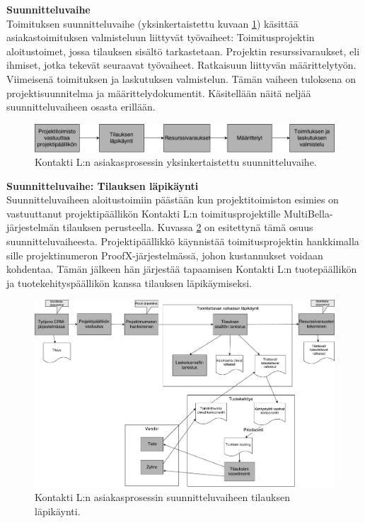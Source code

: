 \documentclass[finnish,12pt,a4paper,pdftex]{article}
\begin{document}
\textbf{Suunnitteluvaihe}\\


Toimituksen suunnitteluvaihe (yksinkertaistettu kuvaan \ref{fig:ykssuun}) käsittää asiakastoimituksen valmisteluun liittyvät työvaiheet: Toimitusprojektin aloitustoimet, jossa tilauksen sisältö tarkastetaan. Projektin resurssivaraukset, eli ihmiset, jotka tekevät seuraavat työvaiheet. Ratkaisuun liittyvän määrittelytyön. Viimeisenä toimituksen ja laskutuksen valmistelun. Tämän vaiheen tuloksena on projektisuunnitelma ja määrittelydokumentit. Käsitellään näitä neljää suunnitteluvaiheen osasta erillään.\\

\begin{figure}[!h]
    \centering
    \includegraphics[scale=0.35]{images/ykssuunn.pdf}
    \caption{Kontakti L:n asiakasprosessin yksinkertaistettu suunnitteluvaihe.}
    \label{fig:ykssuun}
\end{figure}


\textbf{Suunnitteluvaihe: Tilauksen läpikäynti}\\

Suunnitteluvaiheen aloitustoimiin päästään kun projektitoimiston esimies on vastuuttanut projektipäällikön Kontakti L:n toimitusprojektille MultiBella-järjestelmän tilauksen perusteella. Kuvassa \ref{fig:aloitustoimet} on esitettynä tämä osuus suunnitteluvaiheesta. Projektipäällikkö käynnistää toimitusprojektin hankkimalla sille projektinumeron ProofX-järjestelmässä, johon kustannukset voidaan kohdentaa. Tämän jälkeen hän järjestää tapaamisen Kontakti L:n tuotepäällikön ja tuotekehityspäällikön kanssa tilauksen läpikäymiseksi. \\

\begin{figure}[!h]
    \centering
    \includegraphics[scale=0.3]{images/aloitus.pdf}
    \caption{Kontakti L:n asiakasprosessin suunnitteluvaiheen tilauksen läpikäynti.}
    \label{fig:aloitustoimet}
\end{figure}
\end{document}
